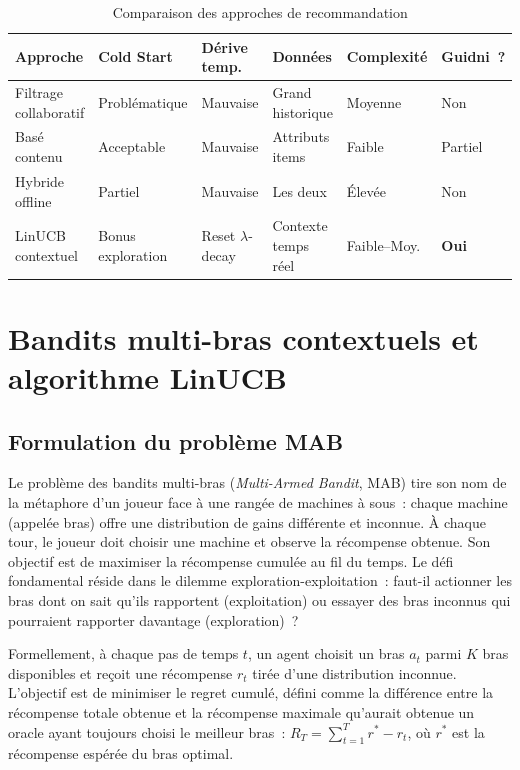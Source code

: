 \begin{table}[H]
    \centering
    \caption{Comparaison des approches de recommandation}
    \label{tab:reco_approaches}
    \small
    \begin{tabular}{p{2.8cm} p{2cm} p{2cm} p{2.2cm} p{1.8cm} p{2.2cm}}
        \toprule
        \textbf{Approche} & \textbf{Cold Start} & \textbf{Dérive temp.} &
        \textbf{Données} & \textbf{Complexité} & \textbf{Guidni~?} \\
        \midrule
        Filtrage collaboratif & Problématique & Mauvaise & Grand historique & Moyenne & Non \\[3pt]
        Basé contenu & Acceptable & Mauvaise & Attributs items & Faible & Partiel \\[3pt]
        Hybride offline & Partiel & Mauvaise & Les deux & Élevée & Non \\[3pt]
        LinUCB contextuel & Bonus exploration & Reset $\lambda$-decay & Contexte temps réel & Faible--Moy. & \textbf{Oui} \\
        \bottomrule
    \end{tabular}
\end{table}


\section{Bandits multi-bras contextuels et algorithme LinUCB}

\subsection{Formulation du problème MAB}

Le problème des bandits multi-bras (\textit{Multi-Armed Bandit}, MAB) tire son nom de la métaphore
d'un joueur face à une rangée de machines à sous~: chaque machine (appelée \og{}bras\fg{}) offre
une distribution de gains différente et inconnue. À chaque tour, le joueur doit choisir une
machine et observe la récompense obtenue. Son objectif est de maximiser la récompense cumulée au
fil du temps. Le défi fondamental réside dans le dilemme exploration-exploitation~: faut-il
actionner les bras dont on sait qu'ils rapportent (exploitation) ou essayer des bras inconnus
qui pourraient rapporter davantage (exploration)~?

Formellement, à chaque pas de temps $t$, un agent choisit un bras $a_t$ parmi $K$ bras
disponibles et reçoit une récompense $r_t$ tirée d'une distribution inconnue. L'objectif est de
minimiser le regret cumulé, défini comme la différence entre la récompense totale obtenue et la
récompense maximale qu'aurait obtenue un oracle ayant toujours choisi le meilleur bras~:
$R_T = \sum_{t=1}^{T} r^* - r_t$, où $r^*$ est la récompense espérée du bras optimal.

